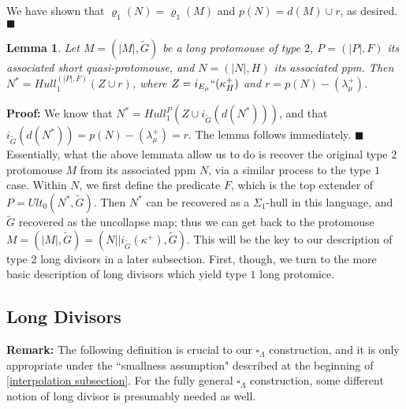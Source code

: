 \documentclass[12pt]{article}
\newtheorem{lem}[thm]{Lemma}
\begin{document}
We have shown that $\varrho_1 (N) = \varrho_1 (M)$ and $p(N) =  d(M) \cup r$, as desired. $\blacksquare$\\









\begin{lem} \label{type 2 recovering $N^*$}
Let $M = (|M|, \tilde{G} )$ be a long protomouse of type $2$, $P = ( |P|, F )$ its associated short quasi-protomouse, and $N = ( |N| , H )$ its associated ppm.  Then $N^* = Hull_1^{(|P|, F)} (Z \cup r )$, where $Z = i_{E_\mu} `` (\kappa_H^+ )$ and $r = p(N) - (\lambda_\mu^+ )$.
\end{lem}

\textbf{Proof:} We know that $N^* = Hull_1^P (Z \cup i_{\tilde{G}} (d(N^*)))$, and that $i_{\tilde{G}} (d(N^*)) = p(N) - (\lambda_\mu^+ ) = r$.  The lemma follows immediately. $\blacksquare$\\

Essentially, what the above lemmata allow us to do is recover the original type $2$ protomouse $M$ from its associated ppm $N$, via a similar process to the type $1$ case.  Within $N$, we first define the predicate $F$, which is the top extender of $P = Ult_0 (N^* , \tilde{G})$.  Then $N^*$ can be recovered as a $\Sigma_1$-hull in this language, and $\tilde{G}$ recovered as the uncollapse map; thus we can get back to the protomouse $M = (|M|, \tilde{G} )= ( N || i_{\tilde{G}}(\kappa^+) , \tilde{G})$.  This will be the key to our description of type $2$ long divisors in a later subsection.  First, though, we turn to the more basic description of long divisors which yield type $1$ long protomice.\\









\subsection{Long Divisors}










\textbf{Remark:}  The following definition is crucial to our $\square_\Lambda$ construction, and it is only appropriate under the ``smallness assumption" described at the beginning of \ref{interpolation subsection}.  For the fully general $\square_\Lambda$ construction, some different notion of long divisor is presumably needed as well.\\
\end{document}
